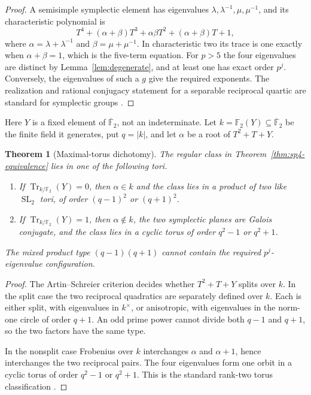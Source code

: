 \documentclass[a4paper]{article}
\newtheorem{theorem}{Theorem}[section]
\newcommand{\F}{\mathbb{F}}
\newcommand{\abs}[1]{\left|#1\right|}
\newcommand{\SL}{\operatorname{SL}}
\DeclareMathOperator{\Tr}{Tr}
\begin{document}
\begin{proof}
	A semisimple symplectic element has eigenvalues
	$\lambda,\lambda^{-1},\mu,\mu^{-1}$, and its characteristic
	polynomial is
	\[
		T^4+(\alpha+\beta)T^3+\alpha\beta T^2
		     +(\alpha+\beta)T+1,
	\]
	where $\alpha=\lambda+\lambda^{-1}$ and
	$\beta=\mu+\mu^{-1}$.  In characteristic two its trace is one exactly
	when $\alpha+\beta=1$, which is the five-term equation.  For $p>5$ the
	four eigenvalues are distinct by Lemma~\ref{lem:degenerate}, and at
	least one has exact order $p^j$.  Conversely, the eigenvalues of such a
	$g$ give the required exponents.  The realization and rational
	conjugacy statement for a separable reciprocal quartic are standard
	for symplectic groups \cite{Wall1963,Enomoto1972}.
\end{proof}

Here $Y$ is a fixed element of $\overline{\F}_2$, not an indeterminate.
Let $k=\F_2(Y)\subseteq\overline{\F}_2$ be the finite field it generates,
put $q=\abs{k}$, and let $\alpha$ be a root of $T^2+T+Y$.

\begin{theorem}[Maximal-torus dichotomy]\label{thm:sp4-tori}
	The regular class in Theorem~\ref{thm:sp4-equivalence} lies in one of
	the following tori.
	\begin{enumerate}
		\item If $\Tr_{k/\F_2}(Y)=0$, then $\alpha\in k$ and the class lies
		      in a product of two like $\SL_2$ tori, of order
		      $(q-1)^2$ or $(q+1)^2$.
		\item If $\Tr_{k/\F_2}(Y)=1$, then $\alpha\notin k$, the two
		      symplectic planes are Galois conjugate, and the class lies
		      in a cyclic torus of order $q^2-1$ or $q^2+1$.
	\end{enumerate}
	The mixed product type $(q-1)(q+1)$ cannot contain the required
	$p^j$-eigenvalue configuration.
\end{theorem}

\begin{proof}
	The Artin--Schreier criterion decides whether $T^2+T+Y$ splits over
	$k$.  In the split case the two reciprocal quadratics are separately
	defined over $k$.  Each is either split, with eigenvalues in
	$k^\times$, or anisotropic, with eigenvalues in the norm-one circle of
	order $q+1$.  An odd prime power cannot divide both $q-1$ and $q+1$,
	so the two factors have the same type.

	In the nonsplit case Frobenius over $k$ interchanges $\alpha$ and
	$\alpha+1$, hence interchanges the two reciprocal pairs.  The four
	eigenvalues form one orbit in a cyclic torus of order $q^2-1$ or
	$q^2+1$.  This is the standard rank-two torus classification
	\cite{Carter1985,Enomoto1972}.
\end{proof}
\end{document}
